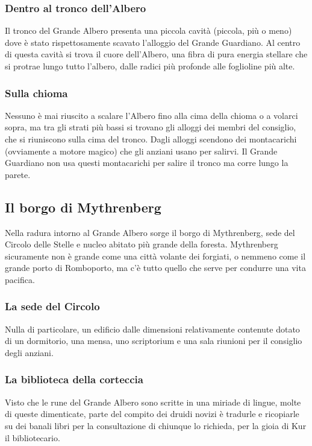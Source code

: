 \subsubsection{Dentro al tronco dell'Albero}

Il tronco del Grande Albero presenta una piccola cavità (piccola, più o meno) dove è stato rispettosamente scavato l'alloggio del Grande Guardiano. Al centro di questa cavità si trova il cuore dell'Albero, una fibra di pura energia stellare che si protrae lungo tutto l'albero, dalle radici più profonde alle foglioline più alte.

\subsubsection{Sulla chioma}

Nessuno è mai riuscito a scalare l'Albero fino alla cima della chioma o a volarci sopra, ma tra gli strati più bassi si trovano gli alloggi dei membri del consiglio, che si riuniscono sulla cima del tronco. Dagli alloggi scendono dei montacarichi (ovviamente a motore magico) che gli anziani usano per salirvi. Il Grande Guardiano non usa questi montacarichi per salire il tronco ma corre lungo la parete.

\subsection{Il borgo di Mythrenberg}

Nella radura intorno al Grande Albero sorge il borgo di Mythrenberg, sede del Circolo delle Stelle e nucleo abitato più grande della foresta. Mythrenberg sicuramente non è grande come una città volante dei forgiati, o nemmeno come il grande porto di Romboporto, ma c'è tutto quello che serve per condurre una vita pacifica.

\subsubsection{La sede del Circolo} Nulla di particolare, un edificio dalle dimensioni relativamente contenute dotato di un dormitorio, una mensa, uno scriptorium e una sala riunioni per il consiglio degli anziani.

\subsubsection{La biblioteca della corteccia} Visto che le rune del Grande Albero sono scritte in una miriade di lingue, molte di queste dimenticate, parte del compito dei druidi novizi è tradurle e ricopiarle su dei banali libri per la consultazione di chiunque lo richieda, per la gioia di Kur il bibliotecario.

